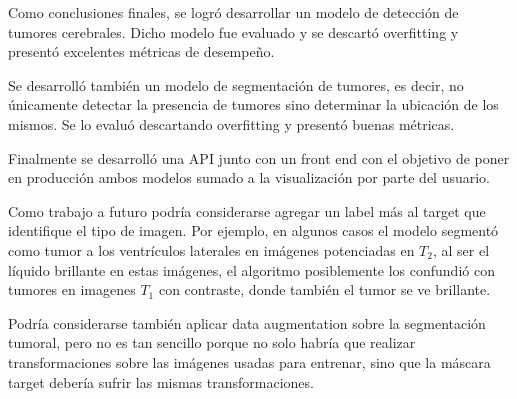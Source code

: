 Como conclusiones finales, se logró desarrollar un modelo de detección de tumores cerebrales. Dicho modelo fue evaluado y se descartó overfitting y presentó excelentes métricas de desempeño.

Se desarrolló también un modelo de segmentación de tumores, es decir, no únicamente detectar la presencia de tumores sino determinar la ubicación de los mismos. Se lo evaluó descartando overfitting y presentó buenas métricas.

Finalmente se desarrolló una API junto con un front end con el objetivo de poner en producción ambos modelos sumado a la visualización por parte del usuario. 

Como trabajo a futuro podría considerarse agregar un label más al target que identifique el tipo de imagen. Por ejemplo, en algunos casos el modelo segmentó como tumor a los ventrículos laterales en imágenes potenciadas en $T_2$, al ser el líquido brillante en estas imágenes, el algoritmo posiblemente los confundió con tumores en imagenes $T_1$ con contraste, donde también el tumor se ve brillante. 

Podría considerarse también aplicar data augmentation sobre la segmentación tumoral, pero no es tan sencillo porque no solo habría que realizar transformaciones sobre las imágenes usadas para entrenar, sino que la máscara target debería sufrir las mismas transformaciones.


